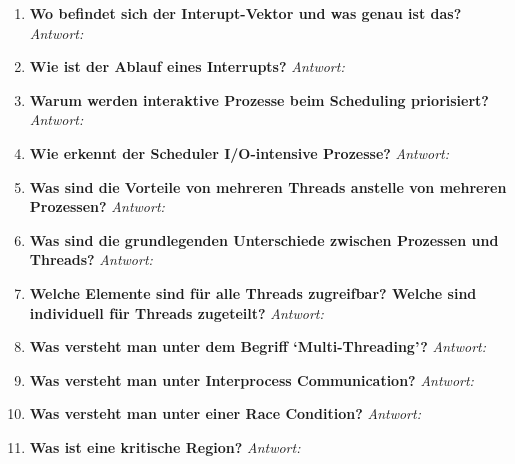 \begin{enumerate}[label=\arabic*.]
      \item \textbf{Wo befindet sich der Interupt-Vektor und was genau ist das?} \newline
            \textit{Antwort:}

      \item \textbf{Wie ist der Ablauf eines Interrupts?} \newline
            \textit{Antwort:}

      \item \textbf{Warum werden interaktive Prozesse beim Scheduling priorisiert?} \newline
            \textit{Antwort:}

      \item \textbf{Wie erkennt der Scheduler I/O-intensive Prozesse?} \newline
            \textit{Antwort:}

      \item \textbf{Was sind die Vorteile von mehreren Threads anstelle von mehreren Prozessen?} \newline
            \textit{Antwort:}

      \item \textbf{Was sind die grundlegenden Unterschiede zwischen Prozessen und Threads?} \newline
            \textit{Antwort:}

      \item \textbf{Welche Elemente sind für alle Threads zugreifbar? Welche sind individuell für Threads
                  zugeteilt?} \newline
            \textit{Antwort:}

      \item \textbf{Was versteht man unter dem Begriff `Multi-Threading'?} \newline
            \textit{Antwort:}

      \item \textbf{Was versteht man unter Interprocess Communication?} \newline
            \textit{Antwort:}

      \item \textbf{Was versteht man unter einer Race Condition?} \newline
            \textit{Antwort:}

      \item \textbf{Was ist eine kritische Region?} \newline
            \textit{Antwort:}


\end{enumerate}
